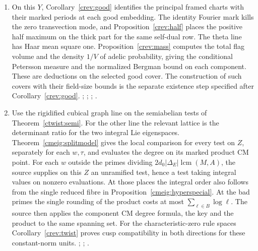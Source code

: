 \begin{enumerate}
\item On this \(Y\), Corollary~\ref{crev:good} identifies the
principal framed charts with their marked periods at each good
embedding. The identity Fourier mark kills the zero transvection
mode, and Proposition~\ref{crev:half} places the positive half
maximum on the thick part for the same self-dual row. The theta
line has Haar mean square one. Proposition~\ref{crev:mass}
computes the total flag volume and the density \(1/V\) of adelic
probability, giving the conditional Petersson measure and the
normalized Bergman bound on each component. These are deductions
on the selected good cover. The construction of such covers
with their field-size bounds is the separate existence step
specified after Corollary~\ref{crev:good}.
;
;
;
.

\item Use the rigidified cubical graph line on the semiabelian tests
of Theorem~\ref{ctwist:semi}. For the other line the relevant lattice
is the determinant ratio for the two integral Lie eigenspaces.
Theorem~\ref{cmeig:splitmodel} gives the local comparison for every
test on \(Z\), separately for each \(w,\tau\), and evaluates the
degree on its marked product CM point. For each \(w\)
outside the primes dividing \(2d_0|\Delta_E|\operatorname{lcm}(M,A)\),
the source supplies on this \(Z\) an unramified test, hence a test
taking integral values on nonzero evaluations. At those places
the integral order also follows from the single reduced fibre
in Proposition~\ref{cmeig:hyperspecial}. At the bad primes the
single rounding of the product costs at most \(\sum_{\ell\in B}\log
\ell\). The source then applies the component CM degree formula,
the key and the product to the same spanning set. For the
characteristic-zero rule spaces Corollary~\ref{crev:twist} proves
cusp compatibility in both directions for these constant-norm
units.
;
;
.


\end{enumerate}
